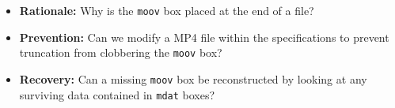 \begin{itemize}
	\item \textbf{Rationale:} Why is the \texttt{moov} box placed at the end of a file?
	\item \textbf{Prevention:} Can we modify a MP4 file within the specifications to prevent truncation from clobbering the \texttt{moov} box?
	\item \textbf{Recovery:} Can a missing \texttt{moov} box be reconstructed by looking at any surviving data contained in \texttt{mdat} boxes?
\end{itemize}

%
%
%
%
